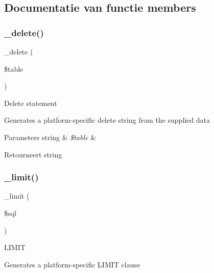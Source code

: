 \subsection{Documentatie van functie members}
\mbox{\label{class_c_i___d_b__pdo__ibm__driver_a133ea8446ded52589bd22cc9163d0896}} 
\subsubsection{\texorpdfstring{\_delete()}{\_delete()}}
{\footnotesize\ttfamily \+\_\+delete (\begin{DoxyParamCaption}\item[{}]{\$table }\end{DoxyParamCaption})\hspace{0.3cm}{\ttfamily [protected]}}

Delete statement

Generates a platform-\/specific delete string from the supplied data


\begin{DoxyParams}[1]{Parameters}
string & {\em \$table} & \\
\hline
\end{DoxyParams}
\begin{DoxyReturn}{Retourneert}
string 
\end{DoxyReturn}
\mbox{\label{class_c_i___d_b__pdo__ibm__driver_a3a02ea06541b8ecc25a33a61651562c8}} 
\subsubsection{\texorpdfstring{\_limit()}{\_limit()}}
{\footnotesize\ttfamily \+\_\+limit (\begin{DoxyParamCaption}\item[{}]{\$sql }\end{DoxyParamCaption})\hspace{0.3cm}{\ttfamily [protected]}}

L\+I\+M\+IT

Generates a platform-\/specific L\+I\+M\+IT clause


